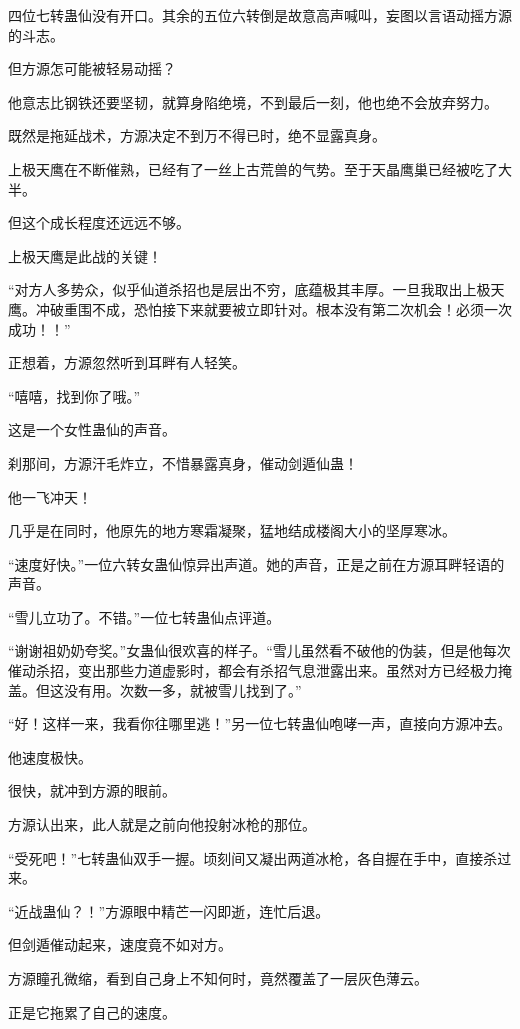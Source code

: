 \begin{this_body}
四位七转蛊仙没有开口。其余的五位六转倒是故意高声喊叫，妄图以言语动摇方源的斗志。

但方源怎可能被轻易动摇？

他意志比钢铁还要坚韧，就算身陷绝境，不到最后一刻，他也绝不会放弃努力。

既然是拖延战术，方源决定不到万不得已时，绝不显露真身。

上极天鹰在不断催熟，已经有了一丝上古荒兽的气势。至于天晶鹰巢已经被吃了大半。

但这个成长程度还远远不够。

上极天鹰是此战的关键！

“对方人多势众，似乎仙道杀招也是层出不穷，底蕴极其丰厚。一旦我取出上极天鹰。冲破重围不成，恐怕接下来就要被立即针对。根本没有第二次机会！必须一次成功！！”

正想着，方源忽然听到耳畔有人轻笑。

“嘻嘻，找到你了哦。”

这是一个女性蛊仙的声音。

刹那间，方源汗毛炸立，不惜暴露真身，催动剑遁仙蛊！

他一飞冲天！

几乎是在同时，他原先的地方寒霜凝聚，猛地结成楼阁大小的坚厚寒冰。

“速度好快。”一位六转女蛊仙惊异出声道。她的声音，正是之前在方源耳畔轻语的声音。

“雪儿立功了。不错。”一位七转蛊仙点评道。

“谢谢祖奶奶夸奖。”女蛊仙很欢喜的样子。“雪儿虽然看不破他的伪装，但是他每次催动杀招，变出那些力道虚影时，都会有杀招气息泄露出来。虽然对方已经极力掩盖。但这没有用。次数一多，就被雪儿找到了。”

“好！这样一来，我看你往哪里逃！”另一位七转蛊仙咆哮一声，直接向方源冲去。

他速度极快。

很快，就冲到方源的眼前。

方源认出来，此人就是之前向他投射冰枪的那位。

“受死吧！”七转蛊仙双手一握。顷刻间又凝出两道冰枪，各自握在手中，直接杀过来。

“近战蛊仙？！”方源眼中精芒一闪即逝，连忙后退。

但剑遁催动起来，速度竟不如对方。

方源瞳孔微缩，看到自己身上不知何时，竟然覆盖了一层灰色薄云。

正是它拖累了自己的速度。


\end{this_body}
